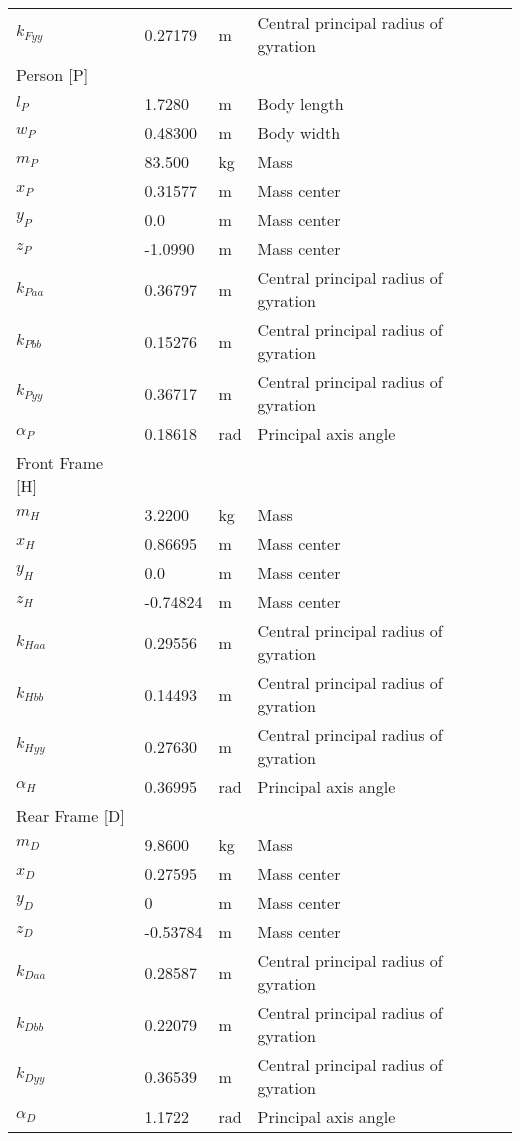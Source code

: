 \documentclass{bmd2019a}
\begin{document}
\begin{table}
\begin{tabular}{llll}
    $k_{Fyy}$ &  0.27179 & \si{\meter} & Central principal radius of gyration \\
    Person [P] & & \\
    \midrule
    $l_P$ &  1.7280 & \si{\meter} & Body length \\
    $w_P$ &  0.48300 & \si{\meter} & Body width \\
    $m_P$ &  83.500 & \si{\kilogram} & Mass \\
    $x_P$ &  0.31577 & \si{\meter} & Mass center \\
    $y_P$ & 0.0 & \si{\meter} & Mass center \\
    $z_P$ & -1.0990 & \si{\meter} & Mass center \\
    $k_{Paa}$ &  0.36797 & \si{\meter} & Central principal radius of gyration \\
    $k_{Pbb}$ &  0.15276 & \si{\meter} & Central principal radius of gyration \\
    $k_{Pyy}$ &  0.36717 & \si{\meter} & Central principal radius of gyration \\
    $\alpha_P$ & 0.18618 & \si{\radian} & Principal axis angle \\
    Front Frame [H] & & \\
    \midrule
    $m_H$ & 3.2200 & \si{\kilogram} & Mass \\
    $x_H$ & 0.86695 & \si{\meter} & Mass center \\
    $y_H$ & 0.0 & \si{\meter} & Mass center \\
    $z_H$ & -0.74824 & \si{\meter} & Mass center \\
    $k_{Haa}$ & 0.29556 & \si{\meter} & Central principal radius of gyration \\
    $k_{Hbb}$ & 0.14493 & \si{\meter} & Central principal radius of gyration \\
    $k_{Hyy}$ & 0.27630 & \si{\meter} & Central principal radius of gyration \\
    $\alpha_H$ & 0.36995 & \si{\radian} & Principal axis angle \\
    Rear Frame [D] & & \\
    \midrule
    $m_D$ &  9.8600 & \si{\kilogram} & Mass \\
    $x_D$ &  0.27595 & \si{\meter} & Mass center \\
    $y_D$ & 0 & \si{\meter} & Mass center \\
    $z_D$ & -0.53784 & \si{\meter} & Mass center \\
    $k_{Daa}$ &  0.28587 & \si{\meter} & Central principal radius of gyration \\
    $k_{Dbb}$ &  0.22079 & \si{\meter} & Central principal radius of gyration \\
    $k_{Dyy}$ &  0.36539 & \si{\meter} & Central principal radius of gyration \\
    $\alpha_D$ &  1.1722 & \si{\radian} & Principal axis angle \\
    \bottomrule
  \end{tabular}
\end{table}
\end{document}
